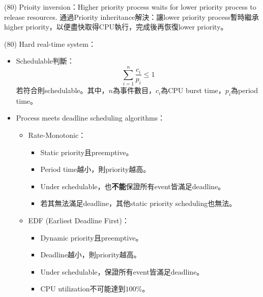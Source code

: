 \begin{theorem}{(80)} Prioity inversion：Higher priority process waits for lower priority process to release resources. 通過Priority inheritance解決：讓lower priority process暫時繼承higher priority，以便盡快取得CPU執行，完成後再恢復lower priority。
\end{theorem}

\begin{theorem}{(80)} Hard real-time system：\begin{itemize}
        \item Schedulable判斷：\begin{equation}
            \sum_{i = 1}^{n} \frac{c_i}{p_i} \le 1
        \end{equation} 若符合則schedulable。其中，$n$為事件數目，$c_i$為CPU burst time，$p_i$為period time。
        \item Process meets deadline scheduling algorithms：\begin{itemize}
            \item Rate-Monotonic：\begin{itemize}
                \item Static priority且preemptive。
                \item Period time越小，則priority越高。
                \item Under schedulable，也\textbf{不能}保證所有event皆滿足deadline。
                \item 若其無法滿足deadline，其他static priority scheduling也無法。
            \end{itemize}
            \item EDF (Earliest Deadline First)：\begin{itemize}
                \item Dynamic priority且preemptive。
                \item Deadline越小，則priority越高。
                \item Under schedulable，保證所有event皆滿足deadline。
                \item CPU utilization不可能達到$100\%$。
            \end{itemize}
        \end{itemize}
    \end{itemize}
\end{theorem}

